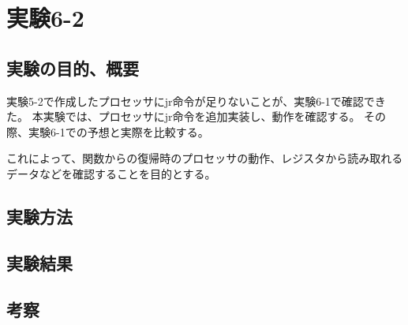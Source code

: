 \section{実験6-2}
\subsection{実験の目的、概要}
実験5-2で作成したプロセッサにjr命令が足りないことが、実験6-1で確認できた。
本実験では、プロセッサにjr命令を追加実装し、動作を確認する。
その際、実験6-1での予想と実際を比較する。

これによって、関数からの復帰時のプロセッサの動作、レジスタから読み取れるデータなどを確認することを目的とする。

\subsection{実験方法}

\subsection{実験結果}

\subsection{考察}
